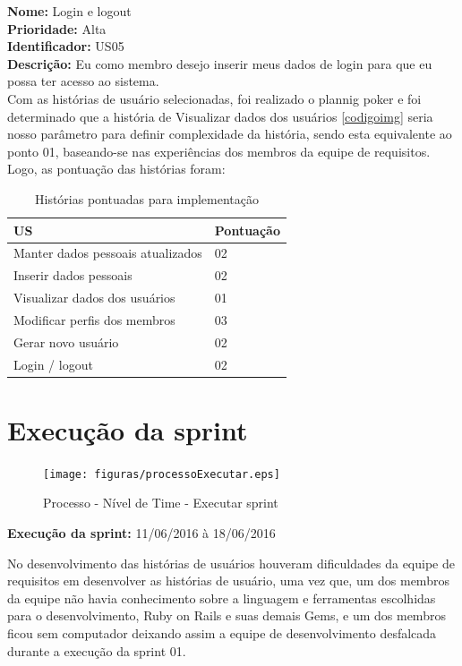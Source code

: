  \indent \textbf{Nome:} Login e logout\\
 \indent \textbf{Prioridade:} Alta\\
 \indent \textbf{Identificador:} US05\\
 \indent \textbf{Descrição:} Eu como membro desejo inserir meus dados de login para que eu possa ter acesso ao sistema.\\

Com as histórias de usuário selecionadas, foi realizado o plannig poker e foi determinado que a história de Visualizar dados dos usuários \ref{codigoimg} seria nosso parâmetro para definir complexidade da história, sendo esta equivalente ao ponto 01, baseando-se nas experiências dos membros da equipe de requisitos. Logo, as pontuação das histórias foram: 

\begin{table}[H]
    \centering
    \label{historiasImplementar}
    \caption{Histórias pontuadas para implementação}
    \begin{tabular}{|l|l|}
        \hline
        US & Pontuação\\
        \hline
        Manter dados pessoais atualizados & 02\\
        \hline
        Inserir dados pessoais &  02\\
        \hline
        Visualizar dados dos usuários & 01\\
        \hline
        Modificar perfis dos membros & 03\\
        \hline
        Gerar novo usuário & 02\\
        \hline 
        Login / logout & 02\\
        \hline
    \end{tabular}
\end{table}

\section{Execução da sprint}
\begin{figure}[H]
    \centering
    \label{identificarExecutar}
    \texttt{[image: figuras/processoExecutar.eps]}
    \caption[Executar sprint]{Processo - Nível de Time - Executar sprint}
\end{figure}

\textbf{Execução da sprint:} 11/06/2016 à 18/06/2016

No desenvolvimento das histórias de usuários houveram dificuldades da equipe de requisitos em desenvolver as histórias de usuário, uma vez que, um dos membros da equipe não havia conhecimento sobre a linguagem e ferramentas escolhidas para o desenvolvimento, Ruby on Rails e suas demais Gems, e um dos membros ficou sem computador deixando assim a equipe de desenvolvimento desfalcada durante a execução da sprint 01.


